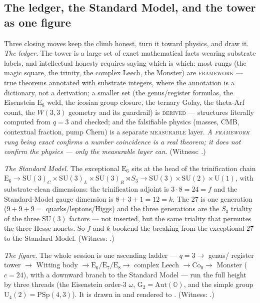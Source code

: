 \documentclass[11pt]{article}
\begin{document}
\subsection{The ledger, the Standard Model, and the tower as one figure}

Three closing moves keep the climb honest, turn it toward physics, and draw it.
\emph{The ledger.} The tower is a large set of exact mathematical facts wearing
substrate labels, and intellectual honesty requires saying which is which: most
rungs (the magic square, the trinity, the complex Leech, the Monster) are
\textsc{framework} --- true theorems annotated with substrate integers, where the
annotation is a dictionary, not a derivation; a smaller set (the genus/register
formulas, the Eisenstein $\mathrm E_8$ weld, the icosian group closure, the
ternary Golay, the theta-Arf count, the $W(3,3)$ geometry and its guardrail) is
\textsc{derived} --- structures literally computed from $q=3$ and checked; and the
falsifiable physics (masses, CMB, contextual fraction, pump Chern) is a separate
\textsc{measurable} layer. \emph{A \textsc{framework} rung being exact confirms a
number coincidence is a real theorem; it does not confirm the physics --- only the
measurable layer can.} (Witness: .)

\emph{The Standard Model.} The exceptional $\mathrm E_6$ sits at the head of the
trinification chain $\mathrm E_6\to\mathrm{SU}(3)_C\times\mathrm{SU}(3)_L\times
\mathrm{SU}(3)_R\rtimes S_3\to\mathrm{SU}(3)\times\mathrm{SU}(2)\times\mathrm U(1)$,
with substrate-clean dimensions: the trinification adjoint is $3\cdot8=24=f$ and
the Standard-Model gauge dimension is $8+3+1=12=k$. The $27$ is one generation
($9+9+9=$ quarks/leptons/Higgs) and the three generations are the $S_3$ triality
of the three $\mathrm{SU}(3)$ factors --- not inserted, but the same triality that
permutes the three Hesse nonets. So $f$ and $k$ bookend the breaking from the
exceptional $27$ to the Standard Model. (Witness:
.)

\emph{The figure.} The whole session is one ascending ladder --- $q=3\to$ genus/
register tower $\to$ Witting body $\to\mathrm E_6/\mathrm E_7/\mathrm E_8\to$
complex Leech $\to\mathrm{Co}_0\to$ Monster ($c=24$), with a downward branch to
the Standard Model --- run the full height by three threads (the Eisenstein
order-$3$ $\omega$, $\mathrm G_2=\mathrm{Aut}(\mathbb O)$, and the simple group
$\mathrm U_4(2)=\mathrm{PSp}(4,3)$). It is drawn in
 and rendered to
. (Witness:
.)
\end{document}

